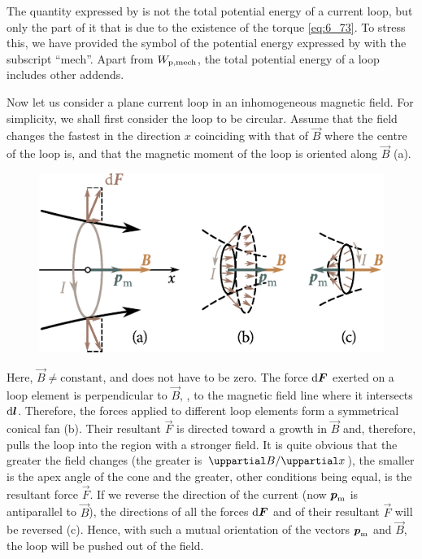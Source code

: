 The quantity expressed by  is not the total potential energy of a current loop, but only the part of it that is due to the existence of the torque \eqref{eq:6_73}. To stress this, we have provided the symbol of the potential energy expressed by  with the subscript ``mech''. Apart from $W_{\text{p,mech}}$, the total potential energy of a loop includes other addends.

Now let us consider a plane current loop in an inhomogeneous magnetic field. For simplicity, we shall first consider the loop to be circular. Assume that the field changes the fastest in the direction $x$ coinciding with that of $\vec{B}$ where the centre of the loop is, and that the magnetic moment of the loop is oriented along $\vec{B}$ (a).

\begin{figure}[t]
	\begin{center}
		\includegraphics[scale=1]{figures/ch_06/fig_6_17.pdf}
		\caption[]{}
		\label{fig:6_17}
	\end{center}
	\vspace{-0.8cm}
\end{figure}

Here, $\vec{B}\neq\text{constant}$, and  does not have to be zero. The force $\mathrm{d}\boldsymbol{F}$ exerted on a loop element is perpendicular to $\vec{B}$, \ie, to the magnetic field line where it intersects $\mathrm{d}\boldsymbol{l}$. Therefore, the forces applied to different loop elements form a symmetrical conical fan (b). Their resultant $\vec{F}$ is directed toward a growth in $\vec{B}$ and, therefore, pulls the loop into the region with a stronger field. It is quite obvious that the greater the field changes (the greater is $\diffinpartial{B}{x}$), the smaller is the apex angle of the cone and the greater, other conditions being equal, is the resultant force $\vec{F}$.
If we reverse the direction of the current (now $\boldsymbol{p}_{\text{m}}$ is antiparallel to $\vec{B}$), the directions of all the forces $\mathrm{d}\boldsymbol{F}$ and of their resultant $\vec{F}$ will be reversed (c). Hence, with such a mutual orientation of the vectors $\boldsymbol{p}_{\text{m}}$ and $\vec{B}$, the loop will be pushed out of the field.


